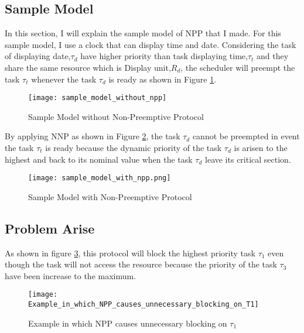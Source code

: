 \subsection{Sample Model}

In this section, I will explain the sample model of NPP that I made. For this sample model, I use a clock that can display time and date. Considering the task of displaying date,$\tau_{d}$ have higher priority than task displaying time,$\tau_{t}$ and they share the same resource which is Display unit,$R_{d}$, the scheduler will preempt the task $\tau_{t}$ whenever the task $\tau_{d}$ is ready as shown in Figure \ref{fig:sample_model_without_npp}.
\begin{figure}[h]
    \centering
    \texttt{[image: sample\_model\_without\_npp]}
    \caption{Sample Model without Non-Preemptive Protocol \cite{b6}}
    \label{fig:sample_model_without_npp}
\end{figure}

By applying NNP as shown in Figure \ref{fig:sample_model_with_npp}, the task $\tau_{d}$ cannot be preempted in event the task $\tau_{t}$ is ready because the dynamic priority of the task $\tau_{d}$ is arisen to the highest and back to its nominal value when the task $\tau_{d}$ leave its critical section. 


\begin{figure}[h]
    \centering
    \texttt{[image: sample\_model\_with\_npp.png]}
    \caption{Sample Model with Non-Preemptive Protocol }
    \label{fig:sample_model_with_npp}
\end{figure}


\subsection{Problem Arise}

As shown in figure \ref{fig:Example_in_which_NPP_causes_unnecessary_blocking_on_T1}, this protocol will block the highest priority task $ \tau_{1} $ even though the task will not access the resource because the priority of the task $\tau_{3}$ have been increase to the maximum.

\begin{figure}[h]
    \centering
    \texttt{[image: Example\_in\_which\_NPP\_causes\_unnecessary\_blocking\_on\_T1]}
    \caption{Example in which NPP causes unnecessary blocking on $ \tau_{1} $ \cite{b5}}
    \label{fig:Example_in_which_NPP_causes_unnecessary_blocking_on_T1}
\end{figure}

